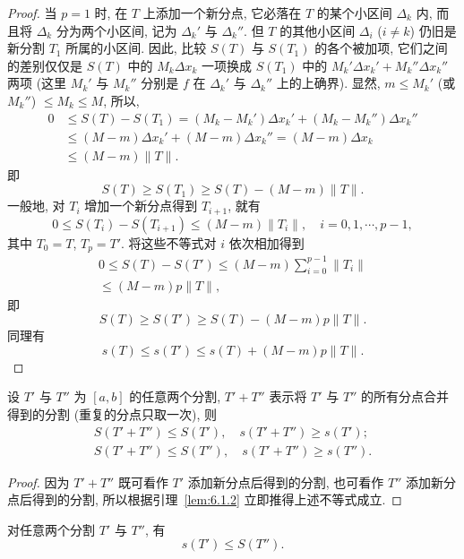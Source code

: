 \begin{proof}
当 $p=1$ 时, 在 $T$ 上添加一个新分点, 它必落在 $T$ 的某个小区间 $\Delta_{k}$ 内, 而且将 $\Delta_{k}$ 分为两个小区间, 记为 $\Delta_{k}'$ 与 $\Delta_{k}''$. 但 $T$ 的其他小区间 $\Delta_{i}$ ($i\neq k$) 仍旧是新分割 $T_{1}$ 所属的小区间. 因此, 比较 $S(T)$ 与 $S(T_{1})$ 的各个被加项, 它们之间的差别仅仅是 $S(T)$ 中的 $M_{k}\Delta x_{k}$ 一项换成 $S(T_{1})$ 中的 $M_{k}'\Delta x_{k}'+M_{k}''\Delta x_{k}''$ 两项 (这里 $M_{k}'$ 与 $M_{k}''$ 分别是 $f$ 在 $\Delta_{k}'$ 与 $\Delta_{k}''$ 上的上确界). 显然, $m\leqslant M_{k}'$ (或 $M_{k}''$) $\leqslant M_{k}\leqslant M$, 所以,
\begin{align*}
0&\leqslant S(T)-S(T_{1})=(M_{k}-M_{k}')\Delta x_{k}'+(M_{k}-M_{k}'')\Delta x_{k}''\\
&\leqslant(M-m)\Delta x_{k}'+(M-m)\Delta x_{k}''=(M-m)\Delta x_{k}\\
&\leqslant(M-m)\|T\|.
\end{align*}
即
\[
S(T)\geqslant S(T_{1})\geqslant S(T)-(M-m)\|T\|.
\]
一般地, 对 $T_{i}$ 增加一个新分点得到 $T_{i+1}$, 就有
\[
0\leqslant S(T_{i})-S(T_{i+1})\leqslant(M-m)\|T_{i}\|,\quad i=0,1,\cdots,p-1,
\]
其中 $T_{0}=T$, $T_{p}=T'$. 将这些不等式对 $i$ 依次相加得到
\begin{gather*}
0\leqslant S(T)-S(T')\leqslant(M-m)\sum_{i=0}^{p-1}\|T_{i}\|\\
\leqslant(M-m)p\|T\|,
\end{gather*}
即
\[
S(T)\geqslant S(T')\geqslant S(T)-(M-m)p\|T\|.
\]
同理有
\[
s(T)\leqslant s(T')\leqslant s(T)+(M-m)p\|T\|.
\]
\end{proof}

\begin{lemma}\label{lem:6.1.3}
设 $T'$ 与 $T''$ 为 $[a,b]$ 的任意两个分割, $T'+T''$ 表示将 $T'$ 与 $T''$ 的所有分点合并得到的分割 (重复的分点只取一次), 则
\begin{gather*}
S(T'+T'')\leqslant S(T'),\quad s(T'+T'')\geqslant s(T');\\
S(T'+T'')\leqslant S(T''),\quad s(T'+T'')\geqslant s(T'').
\end{gather*}
\end{lemma}

\begin{proof}
因为 $T'+T''$ 既可看作 $T'$ 添加新分点后得到的分割, 也可看作 $T''$ 添加新分点后得到的分割, 所以根据引理~\ref{lem:6.1.2} 立即推得上述不等式成立.
\end{proof}

\begin{lemma}\label{lem:6.1.4}
对任意两个分割 $T'$ 与 $T''$, 有
\[
s(T')\leqslant S(T'').
\]
\end{lemma}

